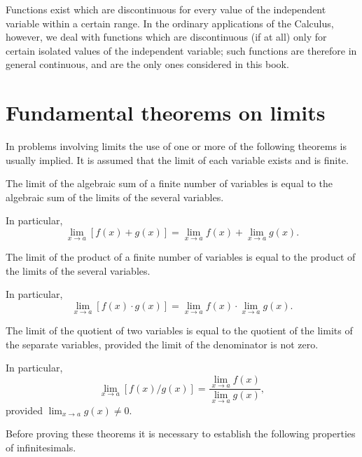 Functions exist which are discontinuous for every value of the 
independent variable within a certain range. In the ordinary 
applications of the Calculus, however, we deal with functions 
which are discontinuous (if at all) only for certain isolated 
values of the independent variable; such functions are therefore 
in general continuous, and are the only ones considered in this book.

\section{Fundamental theorems on limits}
\label{sec:20}

In problems involving limits the use of one or more of the 
following theorems is usually implied. It is assumed that the 
limit of each variable exists and is finite.

\begin{theorem}
{\rm 
\label{thrm:I-20}
The limit of the algebraic sum of a finite number of 
variables is equal to the algebraic sum of the 
limits of the several variables. 

In particular,
\[
\lim_{x\to a} [f(x)+g(x)] = \lim_{x\to a} f(x)
+\lim_{x\to a} g(x).
\]
}
\end{theorem}

\begin{theorem}
{\rm
\label{thrm:II-20}
The limit of the product of a finite number of variables is 
equal to the product of the limits of the several variables.

In particular,
\[
\lim_{x\to a} [f(x)\cdot g(x)] = \lim_{x\to a} f(x)
\cdot \lim_{x\to a} g(x).
\]
}
\end{theorem}

\begin{theorem}
{\rm
\label{thrm:III-20}
The limit of the quotient of two variables is equal to the 
quotient of the limits of the separate variables, provided the 
limit of the denominator is not zero.

In particular,
\[
\lim_{x\to a} [f(x)/g(x)] = \frac{\lim_{x\to a} f(x)}{\lim_{x\to a} g(x)},
\]
provided $\lim_{x\to a} g(x)\not= 0$.
}
\end{theorem}

Before proving these theorems it is necessary to establish 
the following properties of infinitesimals.


